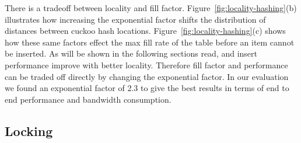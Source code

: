 There is a tradeoff between locality and fill factor.
Figure~\ref{fig:locality-hashing}(b) illustrates how
increasing the exponential factor shifts the distribution of
distances between cuckoo hash locations.
Figure~\ref{fig:locality-hashing}(c) shows how these same
factors effect the max fill rate of the table before an item
cannot be inserted. As will be shown in the following
sections read, and insert performance improve with better
locality. Therefore fill factor and performance can be
traded off directly by changing the exponential factor. In
our evaluation we found an exponential factor of 2.3 to give
the best results in terms of end to end performance and
bandwidth consumption.


\subsection{Locking}

